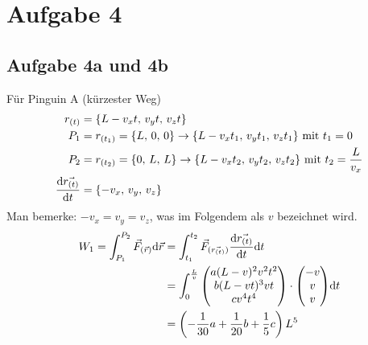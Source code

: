 \documentclass[a4paper,10pt]{extarticle}
\begin{document}
\section*{Aufgabe 4}
\subsection*{Aufgabe 4a und 4b}
Für Pinguin A (kürzester Weg)
\begin{align*}
r_{(t)} &= \{L-v_xt,\, v_yt,\, v_zt \} \\
P_1 &= r_{(t_1)} = \{L , \, 0 , \, 0 \} \rightarrow \{L-v_xt_1,\, v_yt_1,\, v_zt_1 \} \,\, \mbox{mit} \,\, t_1 = 0 \\
P_2 &= r_{(t_2)} = \{0 , \, L , \, L \} \rightarrow \{L-v_xt_2,\, v_yt_2,\, v_zt_2 \} \,\, \mbox{mit} \,\, t_2 = \frac{L}{v_x} \\
\dv{\vec{r_{(t)}}}{t} &= \{-v_x ,\, v_y ,\, v_z \} \\
\end{align*}
Man bemerke: $-v_x = v_y = v_z$, was im Folgendem als $v$ bezeichnet wird.
\begin{align*}
W_1 = \int_{P_1}^{P_2} \vec{F}_{(\vec{r})} \dd \vec{r} &= \int_{t_1}^{t_2} \vec{F}_{( \vec{ r_{(t)} } )} \dv{\vec{r_{(t)}}}{t} \dd t \\
&= \int_0^{\frac{L}{v}} \mqty(a (L-v)^2 v^2 t^2 \\ b (L-vt)^3 v t \\ c v^4 t^4) \cdot \mqty(-v \\ v \\ v) \dd t \\
&= \left(-\frac{1}{30}a + \frac{1}{20}b + \frac{1}{5}c\right)L^5
\end{align*}
\end{document}

